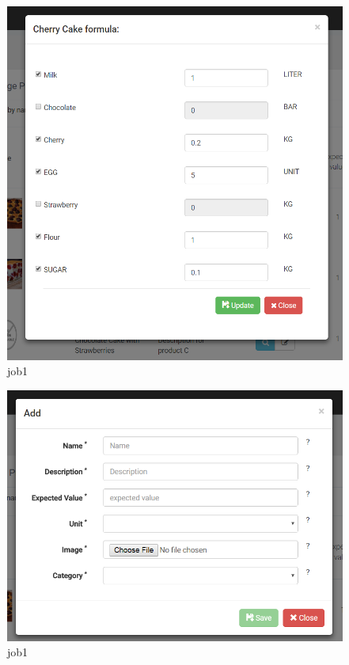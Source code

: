 \documentclass[a4paper,11pt,twoside]{report}
\theoremstyle{definition}
\begin{document}
\begin{figure}[h!]
\begin{center}
\includegraphics[width=\textwidth]{AS/product/3}
\end{center}
\caption{job1}
\end{figure}
\thispagestyle{empty}

\begin{figure}[h!]
\begin{center}
\includegraphics[width=\textwidth]{AS/product/4}
\end{center}
\caption{job1}
\end{figure}
\thispagestyle{empty}
\end{document}
